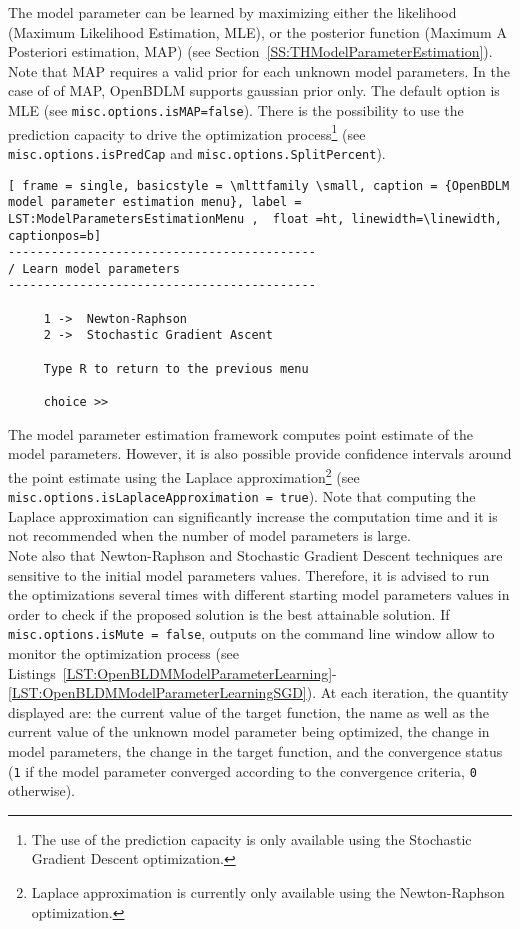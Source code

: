 The model parameter can be learned by maximizing either the likelihood (Maximum Likelihood Estimation, MLE), or the posterior function (Maximum A Posteriori estimation, MAP) (see Section~\ref{SS:THModelParameterEstimation}). 
Note that MAP requires a valid prior for each unknown model parameters.
In the case of of MAP, OpenBDLM supports gaussian prior only.
The default option is MLE (see \lstinline[basicstyle = \mlttfamily \small ]!misc.options.isMAP=false!).
There is the possibility to use the prediction capacity to drive the optimization process\footnote{The use of the prediction capacity is only available using the Stochastic Gradient Descent optimization.} (see  \lstinline[basicstyle = \mlttfamily \small ]!misc.options.isPredCap! and \lstinline[basicstyle = \mlttfamily \small ]!misc.options.SplitPercent!).
\begin{lstlisting}[ frame = single, basicstyle = \mlttfamily \small, caption = {OpenBDLM model parameter estimation menu}, label = LST:ModelParametersEstimationMenu ,  float =ht, linewidth=\linewidth, captionpos=b]
-------------------------------------------
/ Learn model parameters
-------------------------------------------

     1 ->  Newton-Raphson
     2 ->  Stochastic Gradient Ascent

     Type R to return to the previous menu

     choice >> 
\end{lstlisting}
The model parameter estimation framework computes point estimate of the model parameters. 
However, it is also possible provide confidence intervals around the point estimate using the Laplace approximation\footnote{Laplace approximation is currently only available using the Newton-Raphson optimization.} (see \lstinline[basicstyle = \mlttfamily \small ]!misc.options.isLaplaceApproximation = true!).
Note that computing the Laplace approximation can significantly increase the computation time and it is not recommended when the number of model parameters is large.\\

Note also that Newton-Raphson and Stochastic Gradient Descent techniques are sensitive to the initial model parameters values. 
Therefore, it is advised to run the optimizations several times with different starting model parameters values in order to check if the proposed solution is the best attainable solution.
If \lstinline[basicstyle = \mlttfamily \small ]!misc.options.isMute = false!, outputs on the \MATLAB{} command line window allow to monitor the optimization process (see Listings~\ref{LST:OpenBLDMModelParameterLearning}-\ref{LST:OpenBLDMModelParameterLearningSGD}).
At each iteration, the quantity displayed are: the current value of the target function, the name as well as the current value of the unknown model parameter being optimized, the change in model parameters, the change in the target function, and the convergence status (\lstinline[basicstyle = \mlttfamily \small ]!1! if the model parameter converged according to the convergence criteria, \lstinline[basicstyle = \mlttfamily \small ]!0! otherwise).\\

